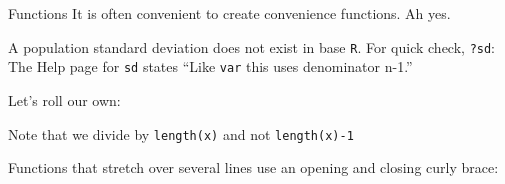 \documentclass[
  11pt,
  ignorenonframetext,
  svgnames, handout, t]{beamer}
\newenvironment{Shaded}{\begin{snugshade}}{\end{snugshade}}
\newcommand{\CommentTok}[1]{\textcolor[rgb]{0.56,0.35,0.01}{\textit{#1}}}
\newcommand{\ControlFlowTok}[1]{\textcolor[rgb]{0.13,0.29,0.53}{\textbf{#1}}}
\newcommand{\DecValTok}[1]{\textcolor[rgb]{0.00,0.00,0.81}{#1}}
\newcommand{\FunctionTok}[1]{\textcolor[rgb]{0.00,0.00,0.00}{#1}}
\newcommand{\NormalTok}[1]{#1}
\newcommand{\OtherTok}[1]{\textcolor[rgb]{0.56,0.35,0.01}{#1}}
\newcommand{\SpecialCharTok}[1]{\textcolor[rgb]{0.00,0.00,0.00}{#1}}
\begin{document}
\begin{frame}[fragile]{Functions}
\protect\hypertarget{functions}{}
It is often convenient to create convenience functions. Ah yes.

A population standard deviation does not exist in base \texttt{R}. For
quick check, \texttt{?sd}: The Help page for \texttt{sd} states ``Like
\texttt{var} this uses denominator n-1.''

Let's roll our own:

\footnotesize

\begin{Shaded}
\end{Shaded}

\normalsize Note that we divide by \texttt{length(x)} and not
\texttt{length(x)-1}

Functions that stretch over several lines use an opening and closing
curly brace:

\footnotesize

\begin{Shaded}
\end{Shaded}

\normalsize
\end{frame}
\end{document}
